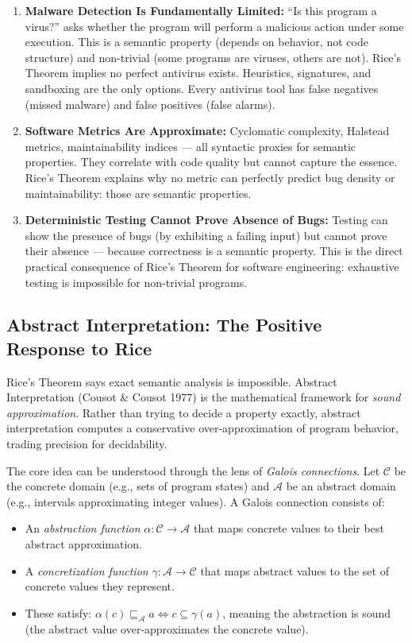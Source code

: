 \begin{enumerate}
\item \textbf{Malware Detection Is Fundamentally Limited:} ``Is this program a virus?'' asks whether the program will perform a malicious action under some execution. This is a semantic property (depends on behavior, not code structure) and non-trivial (some programs are viruses, others are not). Rice's Theorem implies no perfect antivirus exists. Heuristics, signatures, and sandboxing are the only options. Every antivirus tool has false negatives (missed malware) and false positives (false alarms).

\item \textbf{Software Metrics Are Approximate:} Cyclomatic complexity, Halstead metrics, maintainability indices --- all syntactic proxies for semantic properties. They correlate with code quality but cannot capture the essence. Rice's Theorem explains why no metric can perfectly predict bug density or maintainability: those are semantic properties.

\item \textbf{Deterministic Testing Cannot Prove Absence of Bugs:} Testing can show the presence of bugs (by exhibiting a failing input) but cannot prove their absence --- because correctness is a semantic property. This is the direct practical consequence of Rice's Theorem for software engineering: exhaustive testing is impossible for non-trivial programs.
\end{enumerate}

\subsection*{Abstract Interpretation: The Positive Response to Rice}

Rice's Theorem says exact semantic analysis is impossible. Abstract Interpretation (Cousot \& Cousot 1977) is the mathematical framework for \emph{sound approximation}. Rather than trying to decide a property exactly, abstract interpretation computes a conservative over-approximation of program behavior, trading precision for decidability.

The core idea can be understood through the lens of \emph{Galois connections}. Let $\mathcal{C}$ be the concrete domain (e.g., sets of program states) and $\mathcal{A}$ be an abstract domain (e.g., intervals approximating integer values). A Galois connection consists of:

\begin{itemize}
\item An \emph{abstraction function} $\alpha: \mathcal{C} \to \mathcal{A}$ that maps concrete values to their best abstract approximation.
\item A \emph{concretization function} $\gamma: \mathcal{A} \to \mathcal{C}$ that maps abstract values to the set of concrete values they represent.
\item These satisfy: $\alpha(c) \sqsubseteq_\mathcal{A} a \iff c \subseteq \gamma(a)$, meaning the abstraction is sound (the abstract value over-approximates the concrete value).
\end{itemize}


